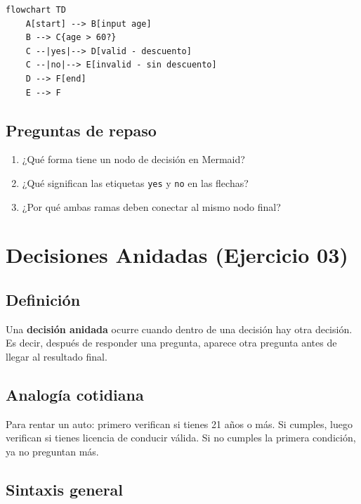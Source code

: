 \documentclass[12pt]{article}
\begin{document}
\begin{lstlisting}[style=mermaidstyle]
flowchart TD
    A[start] --> B[input age]
    B --> C{age > 60?}
    C --|yes|--> D[valid - descuento]
    C --|no|--> E[invalid - sin descuento]
    D --> F[end]
    E --> F
\end{lstlisting}

\subsection{Preguntas de repaso}

\begin{enumerate}
    \item ¿Qué forma tiene un nodo de decisión en Mermaid?
    \item ¿Qué significan las etiquetas \texttt{yes} y \texttt{no} en las flechas?
    \item ¿Por qué ambas ramas deben conectar al mismo nodo final?
\end{enumerate}

\newpage

\section{Decisiones Anidadas (Ejercicio 03)}

\subsection{Definición}

Una \textbf{decisión anidada} ocurre cuando dentro de una decisión hay otra decisión. Es decir, después de responder una pregunta, aparece otra pregunta antes de llegar al resultado final.

\subsection{Analogía cotidiana}

Para rentar un auto: primero verifican si tienes 21 años o más. Si cumples, luego verifican si tienes licencia de conducir válida. Si no cumples la primera condición, ya no preguntan más.

\subsection{Sintaxis general}
\end{document}
